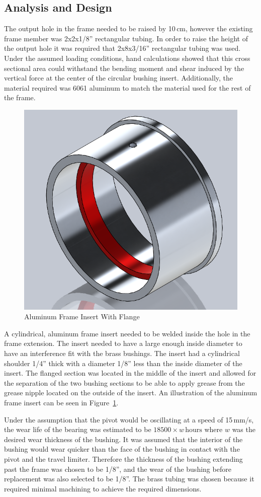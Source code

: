 \subsection{Analysis and Design}
The output hole in the frame needed to be raised by 10\,cm, however the existing frame member was 2x2x1/8'' rectangular tubing. In order to raise the height of the output hole it was required that 2x8x3/16'' rectangular tubing was used. Under the assumed loading conditions, hand calculations showed that this cross sectional area could withstand the bending moment and shear induced by the vertical force at the center of the circular bushing insert. Additionally, the material required was 6061 aluminum to match the material used for the rest of the frame. 
\begin{figure}[H]
\centering
\includegraphics[width=0.25\linewidth]{./images/frame_insert_iso_rndr}
\caption{Aluminum Frame Insert With Flange}
\label{fig:frame_insert_iso_rndr}
\end{figure}

A cylindrical, aluminum frame insert needed to be welded inside the hole in the frame extension. The insert needed to have a large enough inside diameter to have an interference fit with the brass bushings. The insert had a cylindrical shoulder 1/4'' thick with a diameter 1/8'' less than the inside diameter of the insert. The flanged section was located in the middle of the insert and allowed for the separation of the two bushing sections to be able to apply grease from the grease nipple located on the outside of the insert. An illustration of the aluminum frame insert can be seen in Figure~\ref{fig:frame_insert_iso_rndr}.

Under the assumption that the pivot would be oscillating at a speed of 15\,mm/s, the wear life of the bearing was estimated to be $18500\times w\,\text{hours}$ where $w$ was the desired wear thickness of the bushing. It was assumed that the interior of the bushing would wear quicker than the face of the bushing in contact with the pivot and the travel limiter. Therefore the thickness of the bushing extending past the frame was chosen to be 1/8'', and the wear of the bushing before replacement was also selected to be 1/8''. The brass tubing was chosen because it required minimal machining to achieve the required dimensions. 
